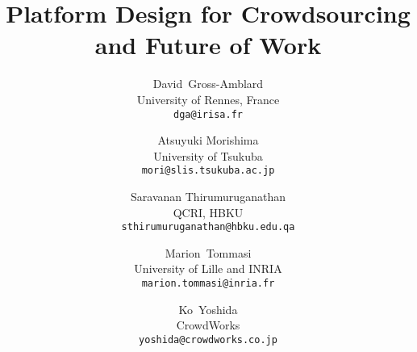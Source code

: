 \documentclass[11pt]{article}
\begin{document}
\title{Platform Design for Crowdsourcing and Future of Work}

\author{David\, Gross-Amblard\\
 University of Rennes, France\\
\texttt{{\footnotesize dga@irisa.fr}}
\and
Atsuyuki Morishima\\
University of Tsukuba\\
\texttt{{\footnotesize mori@slis.tsukuba.ac.jp}}
\and
Saravanan Thirumuruganathan\\
QCRI, HBKU\\
\texttt{{\footnotesize sthirumuruganathan@hbku.edu.qa}}
\and
Marion\, Tommasi\\
University of Lille and INRIA\\
\texttt{{\footnotesize marion.tommasi@inria.fr}}
\and
Ko\, Yoshida\\
CrowdWorks\\
\texttt{{\footnotesize yoshida@crowdworks.co.jp}}
}
\maketitle

\newcommand{\scream}[1]{\textbf{***#1***}}








\vspace{-.6cm}
\enlargethispage{1cm}


\end{document}
